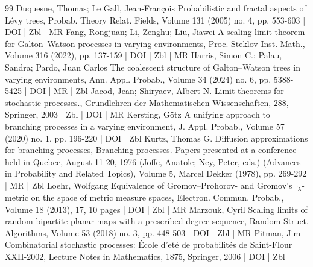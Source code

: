 \begin{thebibliography}{99}
 Duquesne, Thomas; Le Gall, Jean-François Probabilistic and fractal aspects of Lévy trees, Probab. Theory Relat. Fields, Volume 131 (2005) no. 4, pp. 553-603 | DOI | Zbl | MR
 Fang, Rongjuan; Li, Zenghu; Liu, Jiawei A scaling limit theorem for Galton–Watson processes in varying environments, Proc. Steklov Inst. Math., Volume 316 (2022), pp. 137-159 | DOI | Zbl | MR
 Harris, Simon C.; Palau, Sandra; Pardo, Juan Carlos The coalescent structure of Galton–Watson trees in varying environments, Ann. Appl. Probab., Volume 34 (2024) no. 6, pp. 5388-5425 | DOI | MR | Zbl
 Jacod, Jean; Shiryaev, Albert N. Limit theorems for stochastic processes., Grundlehren der Mathematischen Wissenschaften, 288, Springer, 2003 | Zbl | DOI | MR
 Kersting, Götz A unifying approach to branching processes in a varying environment, J. Appl. Probab., Volume 57 (2020) no. 1, pp. 196-220 | DOI | Zbl
 Kurtz, Thomas G. Diffusion approximations for branching processes, Branching processes. Papers presented at a conference held in Quebec, August 11-20, 1976 (Joffe, Anatole; Ney, Peter, eds.) (Advances in Probability and Related Topics), Volume 5, Marcel Dekker (1978), pp. 269-292 | MR | Zbl
 Loehr, Wolfgang Equivalence of Gromov–Prohorov- and Gromov’s ${\underline{\square }_{\lambda }}$-metric on the space of metric measure spaces, Electron. Commun. Probab., Volume 18 (2013), 17, 10 pages | DOI | Zbl | MR
 Marzouk, Cyril Scaling limits of random bipartite planar maps with a prescribed degree sequence, Random Struct. Algorithms, Volume 53 (2018) no. 3, pp. 448-503 | DOI | Zbl | MR
 Pitman, Jim Combinatorial stochastic processes: École d’eté de probabilités de Saint-Flour XXII-2002, Lecture Notes in Mathematics, 1875, Springer, 2006 | DOI | Zbl
\end{thebibliography}
